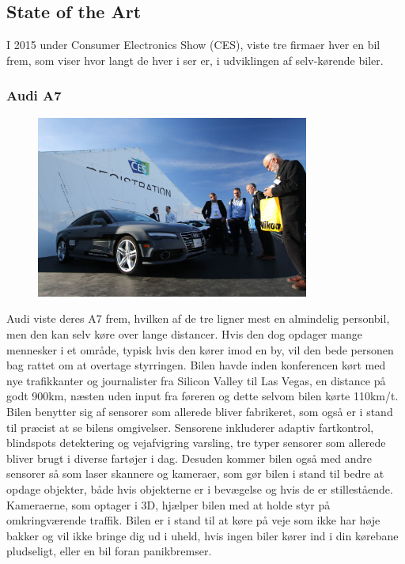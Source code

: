 \subsection{State of the Art} 
I 2015 under Consumer Electronics Show (CES), viste tre firmaer hver en bil frem, som viser hvor langt de hver i ser er, i udviklingen af selv-kørende biler.\cite{CES}
\subsubsection{Audi A7}
\begin{figure}[h!]
	\centering
	\includegraphics[width=0.8\textwidth]{images/150106_0345_ces.jpg}
	\label{fig:Audi_A7}
\end{figure}
Audi viste deres A7 frem, hvilken af de tre ligner mest en almindelig personbil, men den kan selv køre over lange distancer. Hvis den dog opdager mange mennesker i et område, typisk hvis den kører imod en by, vil den bede personen bag rattet om at overtage styrringen. Bilen havde inden konferencen kørt med nye trafikkanter og journalister fra Silicon Valley til Las Vegas, en distance på godt 900km, næsten uden input fra føreren og dette selvom bilen kørte 110km/t. Bilen benytter sig af sensorer som allerede bliver fabrikeret, som også er i stand til præcist at se bilens omgivelser. Sensorene inkluderer adaptiv fartkontrol, blindspots detektering og vejafvigring varsling, tre typer sensorer som allerede bliver brugt i diverse fartøjer i dag. Desuden kommer bilen også med andre sensorer så som laser skannere og kameraer, som gør bilen i stand til bedre at opdage objekter, både hvis objekterne er i bevægelse og hvis de er stillestående. Kameraerne, som optager i 3D, hjælper bilen med at holde styr på omkringværende traffik. Bilen er i stand til at køre på veje som ikke har høje bakker og vil ikke bringe dig ud i uheld, hvis ingen biler kører ind i din kørebane pludseligt, eller en bil foran panikbremser.
